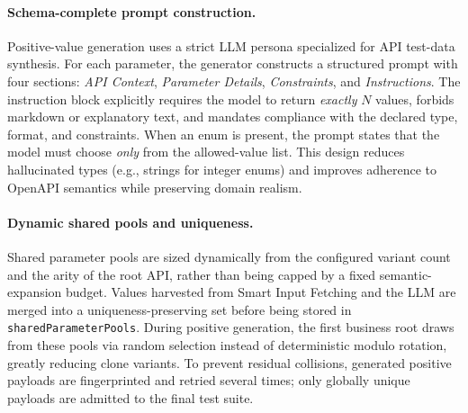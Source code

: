 \documentclass[conference]{IEEEtran}
\begin{document}
\paragraph{Schema-complete prompt construction.}
Positive-value generation uses a strict LLM persona specialized for API test-data synthesis. For each parameter, the generator constructs a structured prompt with four sections: \emph{API Context}, \emph{Parameter Details}, \emph{Constraints}, and \emph{Instructions}. The instruction block explicitly requires the model to return \emph{exactly} $N$ values, forbids markdown or explanatory text, and mandates compliance with the declared type, format, and constraints. When an enum is present, the prompt states that the model must choose \emph{only} from the allowed-value list. This design reduces hallucinated types (e.g., strings for integer enums) and improves adherence to OpenAPI semantics while preserving domain realism.

\paragraph{Dynamic shared pools and uniqueness.}
Shared parameter pools are sized dynamically from the configured variant count and the arity of the root API, rather than being capped by a fixed semantic-expansion budget. Values harvested from Smart Input Fetching and the LLM are merged into a uniqueness-preserving set before being stored in \texttt{sharedParameterPools}. During positive generation, the first business root draws from these pools via random selection instead of deterministic modulo rotation, greatly reducing clone variants. To prevent residual collisions, generated positive payloads are fingerprinted and retried several times; only globally unique payloads are admitted to the final test suite.
\end{document}
